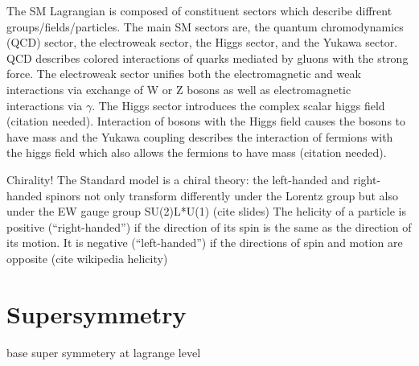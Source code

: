 

The SM Lagrangian is composed of constituent sectors which describe diffrent groups/fields/particles. The main SM sectors are, the quantum chromodynamics (QCD) sector, the electroweak sector, the Higgs sector, and the Yukawa sector. QCD describes colored interactions of quarks mediated by gluons with the strong force. The electroweak sector unifies both the electromagnetic and weak interactions via exchange of W or Z bosons as well as electromagnetic interactions via $\gamma$. The Higgs sector introduces the complex scalar higgs field (citation needed). Interaction of bosons with the Higgs field causes the bosons to have mass and the Yukawa coupling describes the interaction of fermions with the higgs field which also allows the fermions to have mass (citation needed).


Chirality!
The Standard model is a chiral theory: the left-handed and right-handed spinors not only
transform differently under the Lorentz group but also under the EW gauge group
SU(2)L*U(1) (cite slides)
The helicity of a particle is positive (“right-handed”) if the direction of its spin is the same as the direction of its motion. It is negative (“left-handed”) if the directions of spin and motion are opposite (cite wikipedia helicity)

\section{Supersymmetry}

base super symmetery at lagrange level

